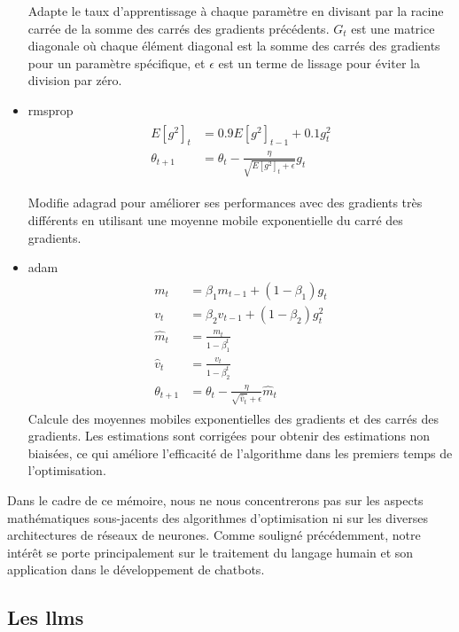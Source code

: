 \begin{itemize}
    Adapte le taux d'apprentissage à chaque paramètre en divisant par la racine carrée de la somme des carrés des gradients précédents. \( G_t \) est une matrice diagonale où chaque élément diagonal est la somme des carrés des gradients pour un paramètre spécifique, et \( \epsilon \) est un terme de lissage pour éviter la division par zéro.
    
    \item \acf{rmsprop}
    \begin{align}
    \begin{split}
        E[g^2]_t &= 0.9 E[g^2]_{t-1} + 0.1 g^2_t \\
        \theta_{t+1} &= \theta_{t} - \frac{\eta}{\sqrt{E[g^2]_t + \epsilon}} g_{t}
    \end{split}
    \end{align}
    
    Modifie \ac{adagrad} pour améliorer ses performances avec des gradients très différents en utilisant une moyenne mobile exponentielle du carré des gradients.
    
    \item \acf{adam}
    \begin{align}
    \begin{split}
        m_t &= \beta_1 m_{t-1} + (1 - \beta_1) g_t \\
        v_t &= \beta_2 v_{t-1} + (1 - \beta_2) g_t^2 \\
        \hat{m}_t &= \frac{m_t}{1 - \beta^t_1} \\
        \hat{v}_t &= \frac{v_t}{1 - \beta^t_2} \\
        \theta_{t+1} &= \theta_{t} - \frac{\eta}{\sqrt{\hat{v}_t} + \epsilon} \hat{m}_t
    \end{split}
    \end{align}
    Calcule des moyennes mobiles exponentielles des gradients et des carrés des gradients. Les estimations sont corrigées pour obtenir des estimations non biaisées, ce qui améliore l'efficacité de l'algorithme dans les premiers temps de l'optimisation.
\end{itemize}

Dans le cadre de ce mémoire, nous ne nous concentrerons pas sur les aspects mathématiques sous-jacents des algorithmes d'optimisation ni sur les diverses architectures de réseaux de neurones. Comme souligné précédemment, notre intérêt se porte principalement sur le traitement du langage humain et son application dans le développement de chatbots.

\subsection{Les \acfp{llm}}
\label{ch:1:section:llm}

